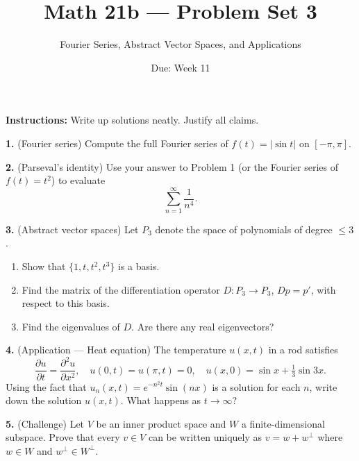 \documentclass{amsart}
\title{Math 21b --- Problem Set 3}
\subtitle{Fourier Series, Abstract Vector Spaces, and Applications}
\date{Due: Week 11}
\begin{document}
\maketitle

\textbf{Instructions:} Write up solutions neatly. Justify all claims.

\bigskip

\textbf{1.} (Fourier series) Compute the full Fourier series of $f(t) = |\sin t|$ on $[-\pi, \pi]$.

\bigskip

\textbf{2.} (Parseval's identity) Use your answer to Problem 1 (or the Fourier series of $f(t) = t^2$) to evaluate
\[
\sum_{n=1}^{\infty} \frac{1}{n^4}.
\]

\bigskip

\textbf{3.} (Abstract vector spaces) Let $P_3$ denote the space of polynomials of degree $\leq 3$.
\begin{enumerate}
    \item[(a)] Show that $\{1, t, t^2, t^3\}$ is a basis.
    \item[(b)] Find the matrix of the differentiation operator $D: P_3 \to P_3$, $Dp = p'$, with respect to this basis.
    \item[(c)] Find the eigenvalues of $D$. Are there any real eigenvectors?
\end{enumerate}

\bigskip

\textbf{4.} (Application --- Heat equation) The temperature $u(x,t)$ in a rod satisfies
\[
\frac{\partial u}{\partial t} = \frac{\partial^2 u}{\partial x^2}, \quad u(0,t) = u(\pi,t) = 0, \quad u(x,0) = \sin x + \tfrac{1}{3}\sin 3x.
\]
Using the fact that $u_n(x,t) = e^{-n^2 t}\sin(nx)$ is a solution for each $n$, write down the solution $u(x,t)$. What happens as $t \to \infty$?

\bigskip

\textbf{5.} (Challenge) Let $V$ be an inner product space and $W$ a finite-dimensional subspace. Prove that every $v \in V$ can be written uniquely as $v = w + w^\perp$ where $w \in W$ and $w^\perp \in W^\perp$.
\end{document}
